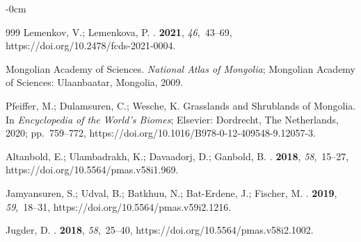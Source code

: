 \documentclass[geosciences,article,accept,pdftex,oneauthor]{Definitions/mdpi}
\begin{document}
\begin{adjustwidth}{-\extralength}{0cm}
\begin{thebibliography}{999}
Lemenkov, V.; Lemenkova, P.
.
 {\bf 2021}, {\em
  46},~43--69, https://doi.org/10.2478/fcds-2021-0004.

{Mongolian Academy of Sciences}.
\newblock \emph{National Atlas of Mongolia}; Mongolian Academy of Sciences: Ulaanbaatar, Mongolia, 2009.


Pfeiffer, M.; Dulamsuren, C.; Wesche, K. {Grasslands and Shrublands of
  Mongolia}.
\newblock In {\em {Encyclopedia of the World's Biomes}}; Elsevier: Dordrecht,
 The Netherlands,  2020; pp.~759--772, https://doi.org/10.1016/B978-0-12-409548-9.12057-3.

Altanbold, E.; Ulambadrakh, K.; Davaadorj, D.; Ganbold, B.
.
 {\bf 2018},
  {\em 58},~15--27, https://doi.org/10.5564/pmas.v58i1.969.

Jamyansuren, S.; Udval, B.; Batkhuu, N.; Bat-Erdene, J.; Fischer, M.
.
 {\bf 2019},
  {\em 59},~18--31, https://doi.org/10.5564/pmas.v59i2.1216.

Jugder, D.
.
 {\bf 2018},
  {\em 58},~25--40, https://doi.org/10.5564/pmas.v58i2.1002.

\end{thebibliography}




\end{adjustwidth}
\end{document}
